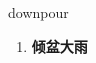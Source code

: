 
\begin{frame}
{\huge downpour}
\begin{center}
\begin{enumerate}\Large
  \item \textbf{倾盆大雨}
\end{enumerate}
\end{center}
\end{frame}
